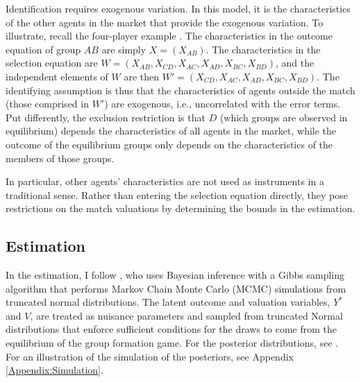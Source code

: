 Identification requires exogenous variation. In this model, it is the characteristics of the other agents in the market that provide the exogenous variation. To illustrate, recall the four-player example . The characteristics in the outcome equation of group $AB$ are simply $X=(X_{AB})$. The characteristics in the selection equation are $W=(X_{AB}, X_{CD}, X_{AC}, X_{AD}, X_{BC}, X_{BD})$, and the independent elements of $W$ are then $W'=(X_{CD}, X_{AC}, X_{AD}, X_{BC}, X_{BD})$. The identifying assumption is thus that the characteristics of agents outside the match (those comprised in $W'$) are exogenous, i.e., uncorrelated with the error terms. Put differently, the exclusion restriction is that $D$ (which groups are observed in equilibrium) depends the characteristics of all agents in the market, while the outcome of the equilibrium groups only depends on the characteristics of the members of those groups.

In particular, other agents' characteristics are not used as instruments in a traditional sense. Rather than entering the selection equation directly, they pose restrictions on the match valuations by determining the bounds in the estimation.


\subsection{Estimation}

In the estimation, I follow \citet{Sorensen2007}, who uses Bayesian inference with a Gibbs sampling algorithm that performs Markov Chain Monte Carlo (MCMC) simulations from truncated normal distributions. The latent outcome and valuation variables, $Y^*$ and $V$, are treated as nuisance parameters  and sampled from truncated Normal distributions that enforce sufficient conditions for the draws to come from the equilibrium of the group formation game.  %
For the posterior distributions, see \citet{Klein2015a}. For an illustration of the simulation of the posteriors, see Appendix \ref{Appendix:Simulation}.

